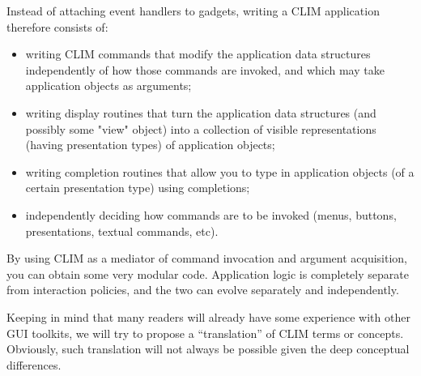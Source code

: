 Instead of attaching event handlers to gadgets, writing a CLIM
application therefore consists of:

\begin{itemize}
\item
 writing CLIM commands that modify the application data structures
  independently of how those commands are invoked, and which may take
  application objects as arguments;
\item
 writing display routines that turn the application data structures (and
  possibly some "view" object) into a collection of visible
  representations (having presentation types) of application objects;
\item
 writing completion routines that allow you to type in application
  objects (of a certain presentation type) using completions;
\item
 independently deciding how commands are to be invoked (menus, buttons,
  presentations, textual commands, etc).
\end{itemize}

By using CLIM as a mediator of command invocation and argument
acquisition, you can obtain some very modular code.  Application logic
is completely separate from interaction policies, and the two can evolve
separately and independently.

Keeping in mind that many readers will already have some experience with
other GUI toolkits, we will try to propose a ``translation'' of CLIM terms
or concepts. Obviously, such translation will not always be possible given
the deep conceptual differences.
